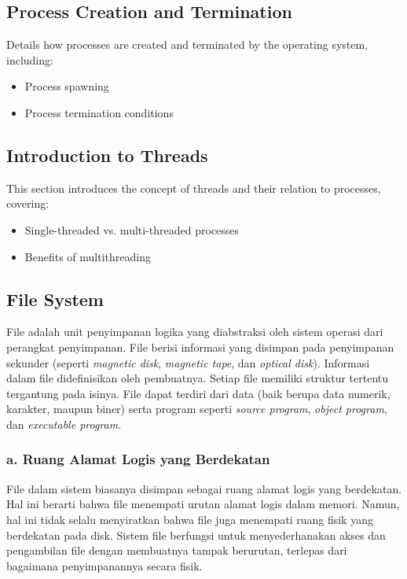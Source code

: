 \documentclass[12pt]{article}
\begin{document}
\subsection{Process Creation and Termination}
Details how processes are created and terminated by the operating system, including:
\begin{itemize}
    \item Process spawning
    \item Process termination conditions
\end{itemize}

\subsection{Introduction to Threads}
This section introduces the concept of threads and their relation to processes, covering:
\begin{itemize}
    \item Single-threaded vs. multi-threaded processes
    \item Benefits of multithreading
\end{itemize}

\subsection{File System}
File adalah unit penyimpanan logika yang diabstraksi oleh sistem operasi dari perangkat penyimpanan. File berisi informasi yang disimpan pada penyimpanan sekunder (seperti \textit{magnetic disk}, \textit{magnetic tape}, dan \textit{optical disk}). Informasi dalam file didefinisikan oleh pembuatnya. Setiap file memiliki struktur tertentu tergantung pada isinya. File dapat terdiri dari data (baik berupa data numerik, karakter, maupun biner) serta program seperti \textit{source program}, \textit{object program}, dan \textit{executable program}.

\subsubsection*{a. Ruang Alamat Logis yang Berdekatan}
File dalam sistem biasanya disimpan sebagai ruang alamat logis yang berdekatan. Hal ini berarti bahwa file menempati urutan alamat logis dalam memori. Namun, hal ini tidak selalu menyiratkan bahwa file juga menempati ruang fisik yang berdekatan pada disk. Sistem file berfungsi untuk menyederhanakan akses dan pengambilan file dengan membuatnya tampak berurutan, terlepas dari bagaimana penyimpanannya secara fisik.
\end{document}
